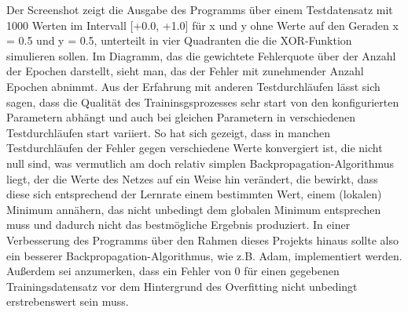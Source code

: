 \documentclass[10pt]{article}
\begin{document}
\noindent Der Screenshot zeigt die Ausgabe des Programms über einem Testdatensatz mit 1000 Werten im Intervall [+0.0, +1.0] für x und y ohne Werte auf den Geraden x = 0.5 und y = 0.5, unterteilt in vier Quadranten die die XOR-Funktion simulieren sollen. Im Diagramm, das die gewichtete Fehlerquote über der Anzahl der Epochen darstellt, sieht man, das der Fehler mit zunehmender Anzahl Epochen abnimmt. Aus der Erfahrung mit anderen Testdurchläufen lässt sich sagen, dass die Qualität des Traininsgsprozesses sehr start von den konfigurierten Parametern abhängt und auch bei gleichen Parametern in verschiedenen Testdurchläufen start variiert. So hat sich gezeigt, dass in manchen Testdurchläufen der Fehler gegen verschiedene Werte konvergiert ist, die nicht null sind, was vermutlich am doch relativ simplen Backpropagation-Algorithmus liegt, der die Werte des Netzes auf ein Weise hin verändert, die bewirkt, dass diese sich entsprechend der Lernrate einem bestimmten Wert, einem (lokalen) Minimum annähern, das nicht unbedingt dem globalen Minimum entsprechen muss und dadurch nicht das bestmögliche Ergebnis produziert. In einer Verbesserung des Programms über den Rahmen dieses Projekts hinaus sollte also ein besserer Backpropagation-Algorithmus, wie z.B. Adam, implementiert werden. Außerdem sei anzumerken, dass ein Fehler von 0 für einen gegebenen Trainingsdatensatz vor dem Hintergrund des Overfitting nicht unbedingt erstrebenswert sein muss.
\end{document}
